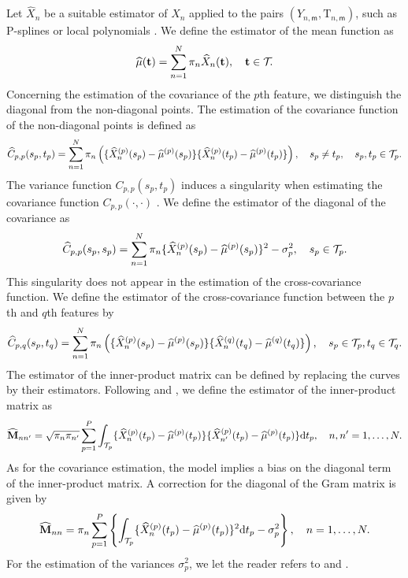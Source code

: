 Let $\widehat{X}_n$ be a suitable estimator of $X_n$ applied to the pairs $(Y_{n, \mathsf{m}}, \mathrm{T}_{n, \mathsf{m}})$, such as P-splines \cite[e.g.][]{eilersTwentyYearsPsplines2015} or local polynomials \cite[e.g.][]{fanLocalPolynomialModelling1996}. We define the estimator of the mean function as
\begin{equation}
    \widehat{\mu}(\mathbf{t}) = \sum_{n = 1}^N \pi_n \widehat{X}_n(\mathbf{t}), \quad \mathbf{t} \in \mathcal{T}_{}.
\end{equation}
Concerning the estimation of the covariance of the $p$th feature, we distinguish the diagonal from the non-diagonal points. The estimation of the covariance function of the non-diagonal points is defined as
\begin{equation}\label{eq:cov_estimation}
    \widehat{C}_{p, p}(s_p, t_p) = \sum_{n = 1}^N \pi_n\left(\{\widehat{X}_n^{(p)}(s_p) - \widehat{\mu}^{(p)}(s_p)\}\{\widehat{X}_n^{(p)}(t_p) - \widehat{\mu}^{(p)}(t_p)\}\right), \quad s_p \neq t_p, \quad s_p, t_p \in \mathcal{T}_{p}.
\end{equation}
The variance function $C_{p, p}(s_p, t_p)$ induces a singularity when estimating the covariance function $C_{p, p}(\cdot, \cdot)$ \cite[see][]{yaoFunctionalDataAnalysis2005,zhangSparseDenseFunctional2016}. We define the estimator of the diagonal of the covariance as
\begin{equation}
    \widehat{C}_{p, p}(s_p, s_p) = \sum_{n = 1}^N \pi_n\{\widehat{X}_n^{(p)}(s_p) - \widehat{\mu}^{(p)}(s_p)\}^2 - \sigma_p^2, \quad s_p \in \mathcal{T}_{p}.
\end{equation}
This singularity does not appear in the estimation of the cross-covariance function. We define the estimator of the cross-covariance function between the $p$th and $q$th features by
\begin{equation}
    \widehat{C}_{p, q}(s_p, t_q) = \sum_{n = 1}^N \pi_n\left(\{\widehat{X}_n^{(p)}(s_p) - \widehat{\mu}^{(p)}(s_p)\}\{\widehat{X}_n^{(q)}(t_q) - \widehat{\mu}^{(q)}(t_q)\}\right), \quad s_p \in \mathcal{T}_{p}, t_q \in \mathcal{T}_{q}.
\end{equation}
The estimator of the inner-product matrix can be defined by replacing the curves by their estimators. Following \cite{benkoCommonFunctionalPrincipal2009} and \cite{grithFunctionalPrincipalComponent2018}, we define the estimator of the inner-product matrix as
\begin{equation}
    \widehat{\mathbf{M}}_{nn^\prime} = \sqrt{\pi_n \pi_{n^{\prime}}}\sum_{p = 1}^P \int_{\mathcal{T}_{p}}\{\widehat{X}_n^{(p)}(t_p) - \widehat{\mu}^{(p)}(t_p)\}\{\widehat{X}^{(p)}_{n^\prime}(t_p) - \widehat{\mu}^{(p)}(t_p)\} {\rm d} t_p, \quad n, n^\prime = 1, \dots, N.
\end{equation}
As for the covariance estimation, the model implies a bias on the diagonal term of the inner-product matrix. A correction for the diagonal of the Gram matrix is given by
\begin{equation}
    \widehat{\mathbf{M}}_{nn} = \pi_n\sum_{p = 1}^P \left\{\int_{\mathcal{T}_{p}}\{\widehat{X}_n^{(p)}(t_p) - \widehat{\mu}^{(p)}(t_p)\}^2 {\rm d} t_p - \sigma_p^2 \right\}, \quad n = 1, \dots, N.
\end{equation}
For the estimation of the variances $\sigma_p^2$, we let the reader refers to \cite{hallVarianceEstimationNonparametric1990} and \cite{hallAsymptoticallyOptimalDifferenceBased1990}.


